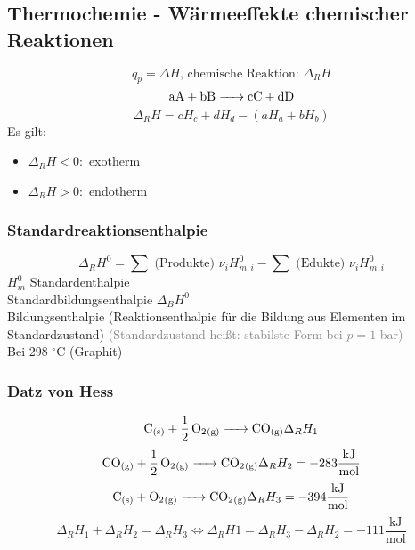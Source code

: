 \documentclass[a4paper]{article}
\begin{document}
\subsection{Thermochemie - Wärmeeffekte chemischer Reaktionen}
\begin{equation*}
    q_p = \Delta H,\, \text{chemische Reaktion: } \Delta_R H
\end{equation*}
\begin{equation*}
    \ce{aA + bB -> cC + dD}
\end{equation*}
\begin{equation*}
    \Delta_R H = cH_c + dH_d - (aH_a + bH_b)
\end{equation*}
Es gilt:
\begin{itemize}
    \item[] $\Delta_R H < 0 :$ exotherm
    \item[] $\Delta_R H > 0 :$ endotherm 
\end{itemize}

\subsubsection{Standardreaktionsenthalpie}
\begin{equation*}
    \Delta_RH^0 = \sum\text{ (Produkte) }\nu_i H_{m,i}^0 - \sum\text{ (Edukte) } \nu_i H_{m,i}^0
\end{equation*}
$H_m^0$ Standardenthalpie\\
Standardbildungsenthalpie $\Delta_BH^0$\\
Bildungsenthalpie (Reaktionsenthalpie für die Bildung aus Elementen im Standardzustand) \textcolor{gray}{(Standardzustand heißt: stabilste Form bei $p=1$ bar)}\\
Bei 298 $^\circ$C  (Graphit)

\subsubsection{Datz von Hess}
\begin{equation*}
    \ce{C_{(s)} + 1/2 O2_{(g)} -> CO_{(g)}} \Delta_R H_1
\end{equation*}
\begin{equation*}
    \ce{CO_{(g)} + 1/2 O2_{(g)} -> CO2_{(g)}} \Delta_R H_2 = -283 \mathrm{\frac{kJ}{mol}}
\end{equation*}
\begin{equation*}
    \ce{C_{(s)} + O2_{(g)} -> CO2_{(g)}} \Delta_R H_3 = -394 \mathrm{\frac{kJ}{mol}}
\end{equation*}
\begin{equation*}
    \Delta_RH_1 + \Delta_RH_2 = \Delta_RH_3 \Leftrightarrow \Delta_RH1 = \Delta_RH_3 - \Delta_RH_2 = -111 \mathrm{\frac{kJ}{mol}}
\end{equation*}
\end{document}
